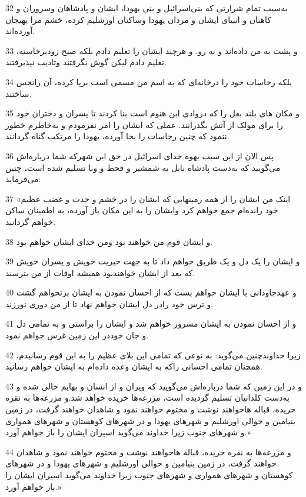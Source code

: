 \par 32 به‌سبب تمام شرارتی که بنی‌اسرائیل و بنی یهودا، ایشان و پادشاهان وسروران و کاهنان و انبیای ایشان و مردان یهودا وساکنان اورشلیم کرده، خشم مرا بهیجان آورده‌اند.
\par 33 و پشت به من داده‌اند و نه رو. و هرچند ایشان را تعلیم دادم بلکه صبح زودبرخاسته، تعلیم دادم لیکن گوش نگرفتند وتادیب نپذیرفتند.
\par 34 بلکه رجاسات خود را درخانه‌ای که به اسم من مسمی است برپا کرده، آن رانجس ساختند.
\par 35 و مکان های بلند بعل را که دروادی ابن هنوم است بنا کردند تا پسران و دختران خود را برای مولک از آتش بگذرانند. عملی که ایشان را امر نفرمودم و به‌خاطرم خطور ننمود که چنین رجاسات را بجا آورده، یهودا را مرتکب گناه گردانند.
\par 36 پس الان از این سبب یهوه خدای اسرائیل در حق این شهر‌که شما درباره‌اش می‌گویید که به‌دست پادشاه بابل به شمشیر و قحط و وبا تسلیم شده است، چنین می‌فرماید:
\par 37 «اینک من ایشان را از همه زمینهایی که ایشان را در خشم و حدت و غضب عظیم خود رانده‌ام جمع خواهم کرد وایشان را به این مکان باز آورده، به اطمینان ساکن خواهم گردانید.
\par 38 و ایشان قوم من خواهند بود ومن خدای ایشان خواهم بود.
\par 39 و ایشان را یک دل و یک طریق خواهم داد تا به جهت خیریت خویش و پسران خویش که بعد از ایشان خواهندبود همیشه اوقات از من بترسند.
\par 40 و عهدجاودانی با ایشان خواهم بست که از احسان نمودن به ایشان برنخواهم گشت و ترس خود رادر دل ایشان خواهم نهاد تا از من دوری نورزند.
\par 41 و از احسان نمودن به ایشان مسرور خواهم شد و ایشان را براستی و به تمامی دل و جان خوددر این زمین غرس خواهم نمود.
\par 42 زیرا خداوندچنین می‌گوید: به نوعی که تمامی این بلای عظیم را به این قوم رسانیدم، همچنان تمامی احسانی راکه به ایشان وعده داده‌ام به ایشان خواهم رسانید.
\par 43 و در این زمین که شما درباره‌اش می‌گویید که ویران و از انسان و بهایم خالی شده و به‌دست کلدانیان تسلیم گردیده است، مزرعه‌ها خریده خواهد شد.و مزرعه‌ها به نقره خریده، قباله هاخواهند نوشت و مختوم خواهند نمود و شاهدان خواهند گرفت، در زمین بنیامین و حوالی اورشلیم و شهرهای یهودا و در شهرهای کوهستان و شهرهای همواری و شهرهای جنوب زیرا خداوند می‌گوید اسیران ایشان را باز خواهم آورد.»
\par 44 و مزرعه‌ها به نقره خریده، قباله هاخواهند نوشت و مختوم خواهند نمود و شاهدان خواهند گرفت، در زمین بنیامین و حوالی اورشلیم و شهرهای یهودا و در شهرهای کوهستان و شهرهای همواری و شهرهای جنوب زیرا خداوند می‌گوید اسیران ایشان را باز خواهم آورد.»
 
